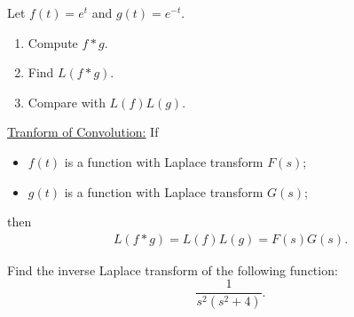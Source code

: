 \documentclass[12pt,a4paper]{article}
\newcounter{example}[section]
\begin{document}
	\begin{example}
	Let $f(t) = e^t$ and $g(t) = e^{-t}$. 
		\begin{enumerate}[label=\textbf{(\alph*)}]
		\item Compute $f \ast g$.
		\item Find $L (f \ast g )$.
		\item Compare with $L(f) L(g)$.
		\end{enumerate}
	\end{example}
	
\vfill

\underline{Tranform of Convolution:} If 
	\begin{itemize}
	\item $f(t)$ is a function with Laplace transform $F(s)$;
	\item $g(t)$ is a function with Laplace transform $G(s)$;
	\end{itemize}
then
	\begin{align*}
	L(f \ast g ) = L(f) L(g) = F(s) G(s) .
	\end{align*}
	
	\newpage
	
	\begin{example}
	Find the inverse Laplace transform of the following function:
		$$\displaystyle \frac{1}{s^2 (s^2 + 4)}.$$
	\end{example}
	
	\newpage
	
\end{document}
